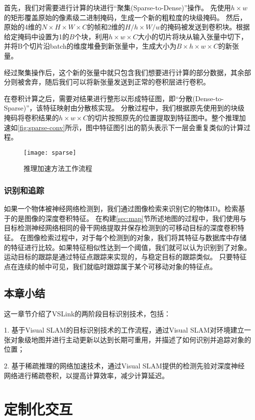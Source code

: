 首先，我们对需要进行计算的块进行“聚集(Sparse-to-Dense)”操作。
先使用$h\times w$的矩形覆盖原始的像素级二进制掩码，生成一个新的粗粒度的块级掩码。
然后，原始的4维的$N \times H \times W \times C$的帧和2维的$H/h \times W/w$的掩码被发送到卷积块。根据给定掩码中设置为1的$B$个块，利用$h\times w \times C$大小的切片将块从输入张量中切下，并将B个切片沿batch的维度堆叠到新张量中，生成大小为$B\times h \times w \times C$的新张量。

经过聚集操作后，这个新的张量中就只包含我们想要进行计算的部分数据，其余部分则被舍弃，随后我们可以将新张量发送到正常的卷积层进行卷积。

在卷积计算之后，需要对结果进行整形以形成特征图，即“分散(Dense-to-Sparse)”，该特征映射由分散核实现。
分散过程中，我们根据原先使用到的块级掩码将卷积结果的$h\times w \times C$的切片按照原先的位置提取到特征图中。整个推理加速如\autoref{fig:sparse-conv}所示，图中特征图引出的箭头表示下一层会重复类似的计算过程。

\begin{figure}[htbp]
	\centering
	\texttt{[image: sparse]}
	\caption{推理加速方法工作流程}
	\label{fig:sparse-conv}
\end{figure}

\subsection{识别和追踪}
如果一个物体被神经网络检测到，我们通过图像检索来识别它的物体ID。检索基于的是图像的深度卷积特征。
在构建\ref{sec:map}节所述地图的过程中，我们使用与目标检测神经网络相同的骨干网络提取并保存检测到的可移动目标的深度卷积特征。
在图像检索过程中，对于每个检测到的对象，我们将其特征与数据库中存储的特征进行比较。如果特征相似性达到一个阈值，我们就可以认为识别到了对象。
运动目标的跟踪是通过特征点跟踪来实现的，与稳定目标的跟踪类似。
只要特征点在连续的帧中可见，我们就临时跟踪属于某个可移动对象的特征点。

\section{本章小结}
这一章节介绍了VSLink的两阶段目标识别技术，包括：

1. 基于Visual SLAM的目标识别技术的工作流程，通过Visual SLAM对环境建立一张对象级地图并进行主动更新以达到长期可重用，并描述了如何识别并追踪对象的位置；

2. 基于稀疏推理的网络加速技术，通过Visual SLAM提供的检测先验对深度神经网络进行稀疏卷积，以提高计算效率，减少计算延迟。


\chapter{定制化交互}
\label{chap:flexible}

